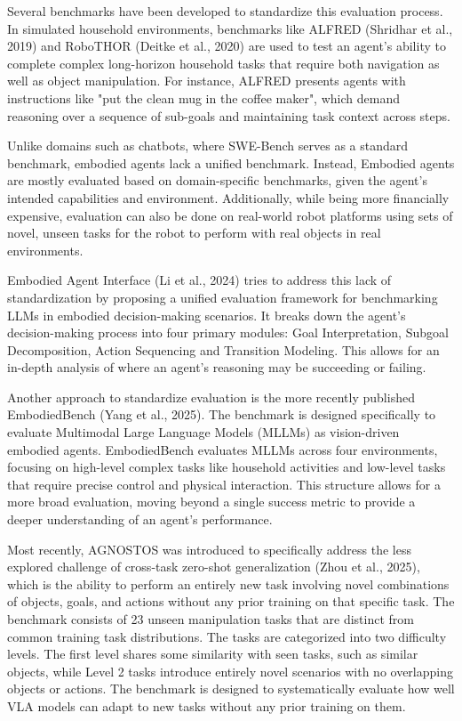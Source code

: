 \documentclass[11pt]{article}
\begin{document}
Several benchmarks have been developed to standardize this evaluation process. In simulated household environments, benchmarks like ALFRED (Shridhar et al., 2019) and RoboTHOR (Deitke et al., 2020) are used to test an agent's ability to complete complex long-horizon household tasks that require both navigation as well as object manipulation. For instance, ALFRED presents agents with instructions like "put the clean mug in the coffee maker", which demand reasoning over a sequence of sub-goals and maintaining task context across steps.

Unlike domains such as chatbots, where SWE-Bench serves as a standard benchmark, embodied agents lack a unified benchmark. 
Instead, Embodied agents are mostly evaluated based on domain-specific benchmarks, given the agent's intended capabilities and environment. Additionally, while being more financially expensive, evaluation can also be done on real-world robot platforms using sets of novel, unseen tasks for the robot to perform with real objects in real environments.

Embodied Agent Interface (Li et al., 2024) tries to address this lack of standardization by proposing a unified evaluation framework for benchmarking LLMs in embodied decision-making scenarios. It breaks down the agent's decision-making process into four primary modules: Goal Interpretation, Subgoal Decomposition, Action Sequencing and Transition Modeling. This allows for an in-depth analysis of where an agent's reasoning may be succeeding or failing.

Another approach to standardize evaluation is the more recently published EmbodiedBench (Yang et al., 2025). The benchmark is designed specifically to evaluate Multimodal Large Language Models (MLLMs) as vision-driven embodied agents. EmbodiedBench evaluates MLLMs across four environments, focusing on high-level complex tasks like household activities and low-level tasks that require precise control and physical interaction. This structure allows for a more broad evaluation, moving beyond a single success metric to provide a deeper understanding of an agent's performance.

Most recently, AGNOSTOS was introduced to specifically address the less explored challenge of cross-task zero-shot generalization (Zhou et al., 2025), which is the ability to perform an entirely new task involving novel combinations of objects, goals, and actions without any prior training on that specific task. The benchmark consists of 23 unseen manipulation tasks that are distinct from common training task distributions. The tasks are categorized into two difficulty levels. The first level shares some similarity with seen tasks, such as similar objects, while Level 2 tasks introduce entirely novel scenarios with no overlapping objects or actions. The benchmark is designed to systematically evaluate how well VLA models can adapt to new tasks without any prior training on them. 
\end{document}
